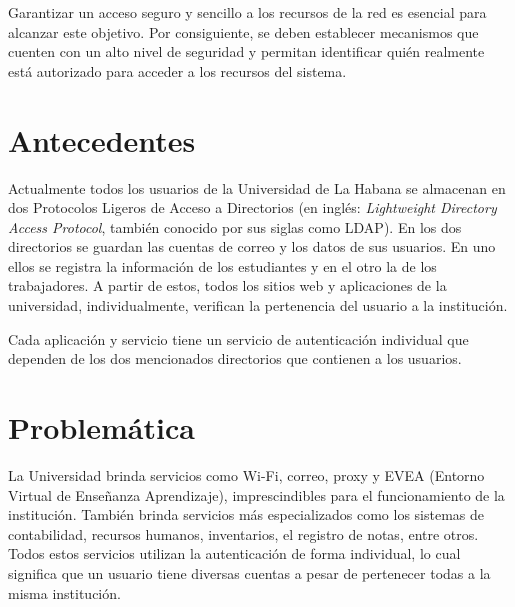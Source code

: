 
Garantizar un acceso seguro y sencillo a los recursos de la red es esencial para alcanzar este objetivo. Por consiguiente, se deben establecer mecanismos que cuenten con un alto nivel de seguridad y permitan identificar quién realmente está autorizado para acceder a los recursos del sistema.




\section*{Antecedentes}

Actualmente todos los usuarios de la Universidad de La Habana se almacenan en dos Protocolos Ligeros de Acceso a Directorios (en inglés: \textit{Lightweight Directory Access Protocol}, también conocido por sus siglas como LDAP). En los dos directorios se guardan las cuentas de correo y los datos de sus usuarios. En uno ellos se registra la información de los estudiantes y en el otro la de los trabajadores. A partir de estos, todos los sitios web y aplicaciones de la universidad, individualmente, verifican la pertenencia del usuario a la institución.

Cada aplicación y servicio tiene un servicio de autenticación individual que dependen de los dos mencionados directorios que contienen a los usuarios.

\section*{Problemática}
La Universidad brinda servicios como Wi-Fi, correo, proxy y EVEA (Entorno Virtual de Enseñanza Aprendizaje), imprescindibles para el funcionamiento de la institución. También brinda servicios más especializados como los sistemas de contabilidad, recursos humanos, inventarios, el registro de notas, entre otros. Todos estos servicios utilizan la autenticación de forma individual, lo cual significa que un usuario tiene diversas cuentas a pesar de pertenecer todas a la misma institución.

